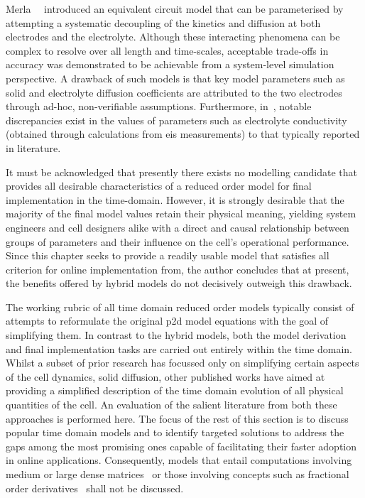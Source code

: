 Merla~\etal{}~\cite{Merla2018} introduced  an equivalent circuit model  that can
be  parameterised by  attempting a  systematic  decoupling of  the kinetics  and
diffusion at  both electrodes  and the  electrolyte. Although  these interacting
phenomena can be complex to resolve  over all length and time-scales, acceptable
trade-offs in  accuracy was  demonstrated to be  achievable from  a system-level
simulation perspective. A  drawback of such models is that  key model parameters
such  as  solid  and  electrolyte   diffusion  coefficients  are  attributed  to
the  two electrodes  through  ad-hoc,  non-verifiable assumptions.  Furthermore,
in~\cite{Merla2018},  notable discrepancies  exist in  the values  of parameters
such as  electrolyte conductivity (obtained through  calculations from \gls{eis}
measurements)  to that  typically reported  in literature.


It must be acknowledged that presently  there exists no modelling candidate that
provides  all desirable  characteristics  of  a reduced  order  model for  final
implementation in  the time-domain. However,  it is strongly desirable  that the
majority  of the  final model  values  retain their  physical meaning,  yielding
system engineers and cell designers alike  with a direct and causal relationship
between  groups of  parameters and  their  influence on  the cell's  operational
performance. Since  this chapter seeks  to provide  a readily usable  model that
satisfies  all  criterion  for online  implementation
from, the  author  concludes that  at  present, the  benefits
offered by hybrid models do not decisively outweigh this drawback.


The working rubric of all time  domain reduced order models typically consist of
attempts to reformulate the original \gls{p2d}  model equations with the goal of
simplifying them.  In contrast to the  hybrid models, both the  model derivation
and  final  implementation  tasks  are  carried out  entirely  within  the  time
domain.  Whilst a  subset of  prior research  has focussed  only on  simplifying
certain aspects  of the  cell dynamics, \eg{}  solid diffusion,  other published
works  have aimed  at  providing a  simplified description  of  the time  domain
evolution of all  physical quantities of the cell. An  evaluation of the salient
literature  from both  these  approaches is  performed here.  The  focus of  the
rest  of  this  section  is  to  discuss  popular  time  domain  models  and  to
identify  targeted  solutions to  address  the  gaps  among the  most  promising
ones  capable of  facilitating  their faster  adoption  in online  applications.
Consequently, models  that entail computations  involving medium or  large dense
matrices~\cite{Li2016,Xu2016,Corno2015}  or  those  involving concepts  such  as
fractional order derivatives~\cite{Sabatier2015, Li2017, Mu2017, Wang2017} shall
not be discussed.


